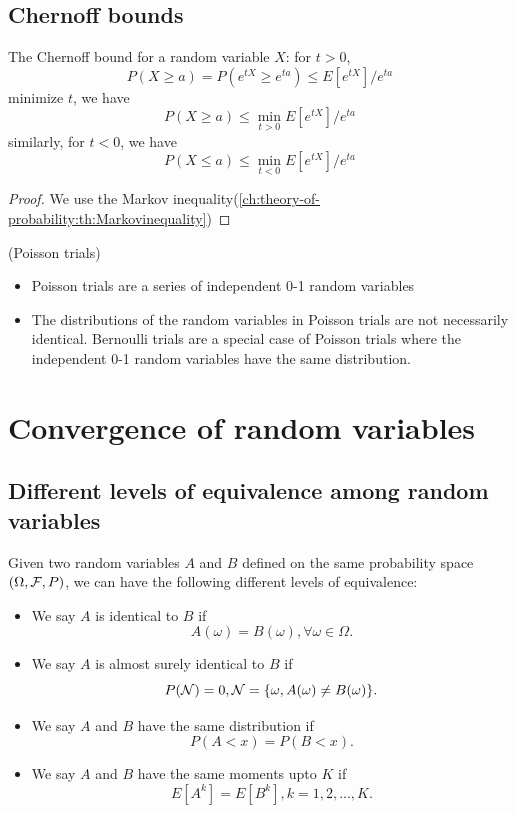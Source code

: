 \begin{refsection}
\subsection{Chernoff bounds}
\begin{theorem}
\cite{mitzenmacher2005probability}The Chernoff bound for a random variable $X$: for $t>0$, $$P(X\geq a) = P(e^{tX} \geq e^{ta}) \leq E[e^{tX}]/e^{ta}$$
minimize $t$, we have
$$P(X\geq a) \leq \min_{t>0}E[e^{tX}]/e^{ta}$$
similarly, for $t<0$, we have
$$P(X\leq a) \leq \min_{t<0}E[e^{tX}]/e^{ta}$$	
\end{theorem}
\begin{proof}
We use the Markov inequality(\autoref{ch:theory-of-probability:th:Markovinequality})
\end{proof}

\begin{remark} (Poisson trials)
\begin{itemize}
    \item Poisson trials are a series of independent 0-1 random variables
    \item The distributions of the random variables in Poisson trials are not necessarily identical. Bernoulli trials are a special case of Poisson trials where the independent 0-1 random variables have the same distribution.
\end{itemize}
\end{remark}




\section{Convergence of random variables}
\subsection{Different levels of equivalence among random variables}

\begin{remark}[]
Given two random variables $A$ and $B$ defined on the same probability space $(\Omega, \mathcal{F}, P)$, we can have the following different levels of equivalence:
\begin{itemize}
	\item We say $A$ is identical to $B$ if $$A(\omega) = B(\omega), \forall \omega\in \Omega.$$
	\item We say $A$ is almost surely identical to $B$ if $$P(\mathcal{N}) = 0, \mathcal{N} = \{\omega, A(\omega) \neq B(\omega) \}.$$
	\item We say $A$ and $B$ have the same distribution if $$P(A <x) = P(B < x).$$
	\item We say $A$ and $B$ have the same moments upto $K$ if $$E[A^k] = E[B^k], k=1,2,...,K.$$
\end{itemize}
\end{remark}


\end{refsection}
